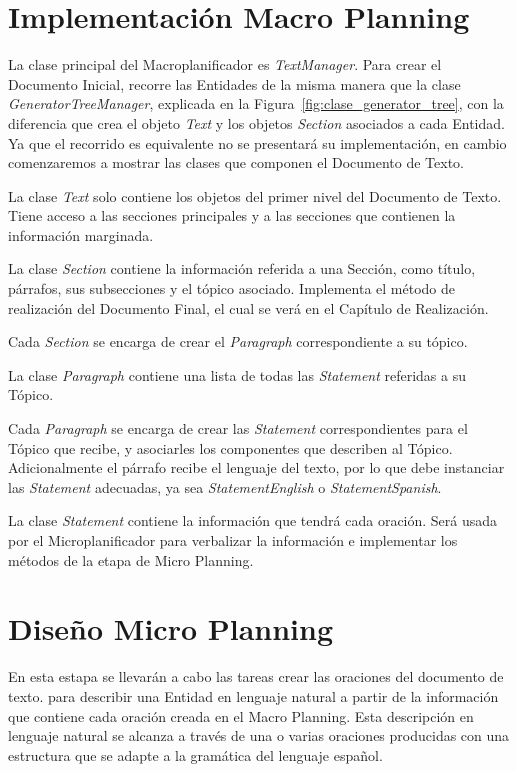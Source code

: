 \section{Implementación Macro Planning}
La clase principal del Macroplanificador es \emph{TextManager}. Para crear el Documento Inicial, recorre las Entidades de la misma manera que la clase \emph{GeneratorTreeManager}, explicada en la Figura~\ref{fig:clase_generator_tree}, con la diferencia que crea el objeto \emph{Text} y los objetos \emph{Section} asociados a cada Entidad. Ya que el recorrido es equivalente no se presentará su implementación, en cambio comenzaremos a mostrar las clases que componen el Documento de Texto.

La clase \emph{Text} solo contiene los objetos del primer nivel del Documento de Texto. Tiene acceso a las secciones principales y a las secciones que contienen la información marginada. 

La clase \emph{Section} contiene la información referida a una Sección, como título, párrafos, sus subsecciones y el tópico asociado. Implementa el método de realización del Documento Final, el cual se verá en el Capítulo de Realización.

Cada \emph{Section} se encarga de crear el \emph{Paragraph} correspondiente a su tópico.

La clase \emph{Paragraph} contiene una lista de todas las \emph{Statement} referidas a su Tópico. 

Cada \emph{Paragraph} se encarga de crear las \emph{Statement} correspondientes para el Tópico que recibe, y asociarles los componentes que describen al Tópico. Adicionalmente el párrafo recibe el lenguaje del texto, por lo que debe instanciar las \emph{Statement} adecuadas, ya sea \emph{StatementEnglish} o \emph{StatementSpanish}.

La clase \emph{Statement} contiene la información que tendrá cada oración. Será usada por el Microplanificador para verbalizar la información e implementar los métodos de la etapa de Micro Planning. 

\section{Diseño Micro Planning}
En esta estapa se llevarán a cabo las tareas crear las oraciones del documento de texto.
para describir una Entidad en lenguaje natural a partir de la información que contiene cada oración creada en el Macro Planning. Esta descripción en lenguaje natural se alcanza a través de una o varias oraciones producidas con una estructura que se adapte a la gramática del lenguaje español.

